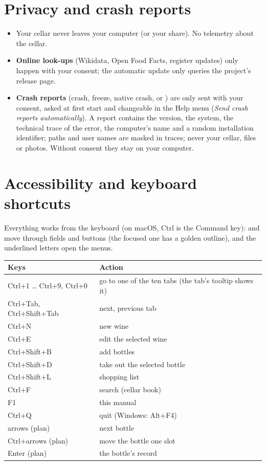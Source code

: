 \documentclass[11pt,a4paper]{article}
\begin{document}
\section{Privacy and crash reports}
\label{sec:confidentialite}
\begin{itemize}
  \item Your cellar never leaves your computer (or your share). No telemetry about the cellar.
  \item \textbf{Online look-ups} (Wikidata, Open Food Facts, register updates) only happen with your consent;
        the automatic update only queries the project's release page.
  \item \textbf{Crash reports} (crash, freeze, native crash, or ) are only
        sent with your consent, asked at first start and changeable in the Help menu (\emph{Send crash reports
        automatically}). A report contains the version, the system, the technical trace of the error, the
        computer's name and a random installation identifier; paths and user names are masked in traces; never
        your cellar, files or photos. Without consent they stay on your computer.
\end{itemize}

\section{Accessibility and keyboard shortcuts}
Everything works from the keyboard (on macOS, Ctrl is the Command key):  and 
move through fields and buttons (the focused one has a golden outline),  and the underlined
letters open the menus.

\begin{center}
\begin{tabular}{>{\sffamily}l l}
\toprule
\textbf{Keys} & \textbf{Action} \\
\midrule
Ctrl+1 … Ctrl+9, Ctrl+0 & go to one of the ten tabs (the tab's tooltip shows it) \\
Ctrl+Tab, Ctrl+Shift+Tab & next, previous tab \\
Ctrl+N & new wine \\
Ctrl+E & edit the selected wine \\
Ctrl+Shift+B & add bottles \\
Ctrl+Shift+D & take out the selected bottle \\
Ctrl+Shift+L & shopping list \\
Ctrl+F & search (cellar book) \\
F1 & this manual \\
Ctrl+Q & quit (Windows: Alt+F4) \\
\midrule
arrows (plan) & next bottle \\
Ctrl+arrows (plan) & move the bottle one slot \\
Enter (plan) & the bottle's record \\
\bottomrule
\end{tabular}
\end{center}
\end{document}
